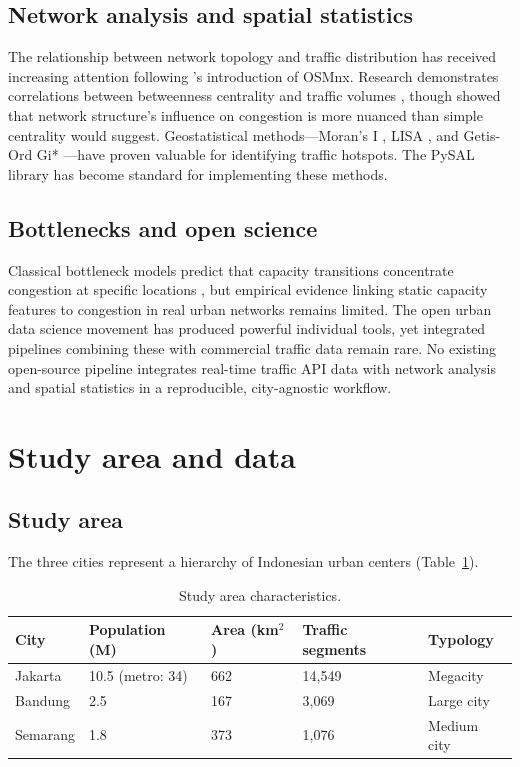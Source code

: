\documentclass[preprint,12pt,authoryear]{elsarticle}
\begin{document}
\subsection{Network analysis and spatial statistics}

The relationship between network topology and traffic distribution has received increasing attention following \citet{Boeing2017}'s introduction of OSMnx. Research demonstrates correlations between betweenness centrality and traffic volumes \citep{Gao2013,Porta2006}, though \citet{Kirkley2018} showed that network structure's influence on congestion is more nuanced than simple centrality would suggest. Geostatistical methods---Moran's I \citep{Moran1950}, LISA \citep{Anselin1995}, and Getis-Ord Gi* \citep{Getis1992,Ord1995}---have proven valuable for identifying traffic hotspots. The PySAL library \citep{Rey2010} has become standard for implementing these methods.

\subsection{Bottlenecks and open science}

Classical bottleneck models predict that capacity transitions concentrate congestion at specific locations \citep{Arnott1993,Daganzo2007}, but empirical evidence linking static capacity features to congestion in real urban networks remains limited. The open urban data science movement has produced powerful individual tools, yet integrated pipelines combining these with commercial traffic data remain rare. No existing open-source pipeline integrates real-time traffic API data with network analysis and spatial statistics in a reproducible, city-agnostic workflow.


\section{Study area and data}
\label{sec:data}

\subsection{Study area}

The three cities represent a hierarchy of Indonesian urban centers (Table~\ref{tab:studyarea}).

\begin{table}[htbp]
\centering
\caption{Study area characteristics.}
\label{tab:studyarea}
\begin{tabular}{lllll}
\toprule
City & Population (M) & Area (km$^2$) & Traffic segments & Typology \\
\midrule
Jakarta  & 10.5 (metro: 34) & 662 & 14,549 & Megacity \\
Bandung  & 2.5              & 167 & 3,069  & Large city \\
Semarang & 1.8              & 373 & 1,076  & Medium city \\
\bottomrule
\end{tabular}
\end{table}
\end{document}
